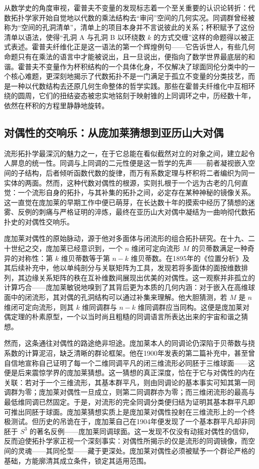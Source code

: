 \documentclass[12pt,a4paper]{article}
\begin{document}
从数学史的角度审视，霍普夫不变量的发现标志着一个至关重要的认识论转折：代数拓扑学家开始自觉地以代数的乘法结构去“审问”空间的几何实况。同调群曾经被称为“空间的孔洞清单”，清单上的项目本身并不言说彼此的关系；杯积赋予了这份清单以语法，使得“孔洞 A 与孔洞 B 以环绕数 $k$ 的方式交缠”这样的命题得以被正式表述。霍普夫纤维化正是这一语法的第一个辉煌例句——它告诉世人，有些几何命题只有在乘法的语言中才能被说出，且一旦说出，便指向了数学世界最底层的和谐。霍普夫不变量作为杯积结构的一个具体化身，不仅解决了球面同伦分类中的一个核心难题，更深刻地揭示了代数拓扑不是一门满足于孤立不变量的分类技艺，而是一种以代数结构去还原几何生命整体的哲学实践。那些在霍普夫纤维化中互相环绕的圆周，它们的扭结姿态被忠实地铭刻于映射锥的上同调环之中，历经数十年，依然在杯积的方程里静静地旋转。

\subsection{对偶性的交响乐：从庞加莱猜想到亚历山大对偶}

流形拓扑学最深沉的魅力之一，在于它总能在看似截然对立的对象之间，建立起令人屏息的统一性。同调与上同调的二元性便是这一哲学的先声——前者凝视嵌入空间的子结构，后者倾听函数代数的旋律，而万有系数定理与杯积将二者编织为同一实体的两面。然而，这种代数对偶性的根源，实则扎根于一个远为古老的几何直觉：一个流形自身的拓扑，与其补集的拓扑之间，必定存在某种神秘的镜像关系。这一直觉在庞加莱的早期工作中便已萌芽，在长达数十年的摸索中经历了猜想的迷雾、反例的刺痛与严格证明的淬炼，最终在亚历山大对偶中凝结为一曲响彻代数拓扑史的对偶性交响乐。

庞加莱对偶性的原始脉动，源于他对多面体与闭流形的组合拓扑研究。在十九、二十世纪之交，庞加莱已经意识到，一个 $n$ 维闭可定向流形 $M$ 的贝蒂数满足一种奇异的对称性：第 $k$ 维贝蒂数等于第 $n-k$ 维贝蒂数。在1895年的《位置分析》及其后续补充中，他以单纯剖分与关联矩阵为工具，发现若将多面体的面按维数排列，其边缘关系矩阵的秩在互补维数间展现出优美的对偶性。这一观察并非孤立的计算巧合——庞加莱敏锐地嗅到了其背后更为本质的几何内涵：对于嵌入在高维球面中的闭流形，其对偶的孔洞结构可以通过补集来理解。他大胆猜测，若 $M$ 是 $n$ 维闭可定向流形，则其 $k$ 维同调群与 $n-k$ 维同调群应当同构。这便是庞加莱对偶定理的朴素原型，一个以当时尚且粗糙的同调语言所表达出来的宇宙和谐之猜想。

然而，这条通往对偶性的路途绝非坦途。庞加莱本人的同调论仍深陷于贝蒂数与挠系数的计算泥沼，缺乏清晰的群论框架。他在1900年发表的第二篇补充中，甚至曾自信地宣称自己证明了每一个二维同调平凡的闭三维流形必同胚于三维球面——这便是后来震惊学界的庞加莱猜想。这一猜想的真正深度，恰在于它与对偶性的内在关联：若对于一个三维流形，其基本群平凡，则由同调论的基本事实可知其第一同调群为零；庞加莱对偶性一旦成立，则第二同调群亦为零；而三维闭流形的最高与最低维同调已然固定。于是，对流形的完全同调分类便归结为证明其基本群平凡即可推出同胚于球面。庞加莱猜想实质上是庞加莱对偶性投射在三维流形上的一个终极测试。但历史的吊诡在于，庞加莱自己在1904年便发现了一个基本群平凡却非同胚于 $S^3$ 的著名反例——庞加莱同调球面。这一发现不仅没有动摇对偶性的信仰，反而迫使拓扑学家正视一个深刻事实：对偶性所揭示的仅是流形的同调镜像，而空间的灵魂——其同伦型——藏于更深处。庞加莱对偶性必须被赋予一个群论严格的基础，方能廓清其成立条件，锁定其适用范围。
\end{document}
